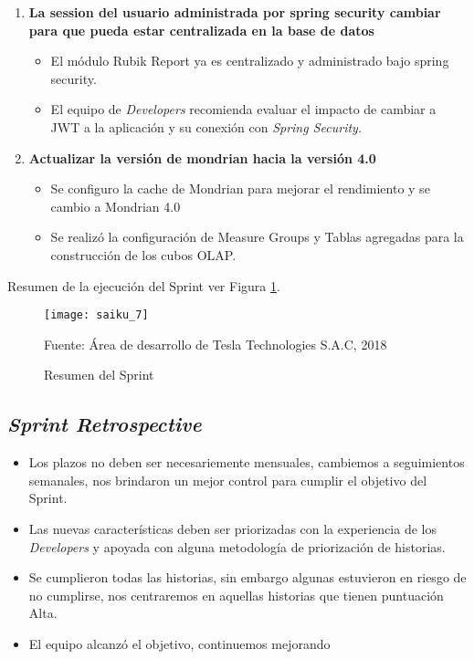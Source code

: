 \begin{spacing}{1.5}
\begin{enumerate}
			\item \textbf{La session del usuario administrada por spring security cambiar para que pueda estar centralizada en la base de datos}
				\begin{itemize}
					\item El m\'{o}dulo Rubik Report ya es centralizado y administrado bajo spring security.
					\item El equipo de \textit{Developers} recomienda evaluar el impacto de cambiar a JWT a la aplicaci\'{o}n y su conexi\'{o}n con \textit{Spring Security}.
				\end{itemize}
			
			\item \textbf{Actualizar la versi\'{o}n de mondrian hacia la versi\'{o}n 4.0}
				\begin{itemize}
					\item Se configuro la cache de Mondrian para mejorar el rendimiento y se cambio a Mondrian 4.0
					\item Se realiz\'{o} la configuraci\'{o}n de Measure Groups y Tablas agregadas para la construcci\'{o}n de los cubos OLAP.
				\end{itemize}
			
		\end{enumerate}
		Resumen de la ejecuci\'{o}n del Sprint ver Figura \ref{figure:chaperIII_10}.
			
			\begin{figure}[H]
				\centering
				\texttt{[image: saiku\_7]}
				\caption {\centering \small{Resumen del Sprint}} \label{figure:chaperIII_10}
				\small {Fuente: \'{A}rea de desarrollo de Tesla Technologies S.A.C, 2018}
			\end{figure}
			
		
		
	
		
		
			
	\subsection{\textit{Sprint Retrospective}}
	\begin{itemize}
		\item Los plazos no deben ser necesariemente mensuales, cambiemos a seguimientos semanales, nos brindaron un mejor control para cumplir el objetivo del Sprint.
		\item Las nuevas caracter\'{i}sticas deben ser priorizadas con la experiencia de los \textit{Developers} y apoyada con alguna metodolog\'{i}a de priorizaci\'{o}n de historias.
		\item Se cumplieron todas las historias, sin embargo algunas estuvieron en riesgo de no cumplirse, nos centraremos en aquellas historias que tienen puntuaci\'{o}n Alta.
		\item El equipo alcanz\'{o} el objetivo, continuemos mejorando
	\end{itemize}


\end{spacing}
